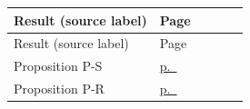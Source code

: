 \begin{center}\footnotesize
\begin{longtable}{@{}L{0.62\linewidth}l@{}}
\toprule Result (source label) & Page \\ \midrule\endfirsthead
\toprule Result (source label) & Page \\ \midrule\endhead
Proposition P-S & \hyperref[pG-res-proposition-P-S]{p.~\pageref{pG-res-proposition-P-S}} \\
Proposition P-R & \hyperref[pG-res-proposition-P-R]{p.~\pageref{pG-res-proposition-P-R}} \\
\bottomrule
\end{longtable}
\end{center}
